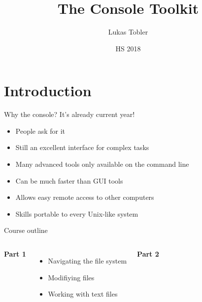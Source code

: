 

\title{The Console Toolkit}
\author{Lukas Tobler}
\date{HS 2018}


	\begin{frame}
		\titlepage%
	\end{frame}

    \section{Introduction}

    \begin{frame}[t,fragile]{Why the console? It's already current year!}
        \begin{itemize}
            \item People ask for it
            \item Still an excellent interface for complex tasks
            \item Many advanced tools only available on the command line
            \item Can be much faster than GUI tools
            \item Allows easy remote access to other computers
            \item Skills portable to every Unix-like system
        \end{itemize}
    \end{frame}

    \begin{frame}[t,fragile]{Course outline}
        \begin{columns}
            \textbf{Part 1}
            \begin{itemize}
                \item Navigating the file system
                \item Modifiying files
                \item Working with text files
            \end{itemize}
            \textbf{Part 2}
        \end{columns}
    \end{frame}

